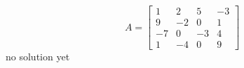 {
\[A=
\begin{bmatrix}
	1 & 2 & 5 & -3 \\
	9 & -2 & 0 & 1 \\
	-7 & 0 & -3 & 4\\
	1 & -4 & 0 & 9
\end{bmatrix}
\]
}
{
no solution yet
}
